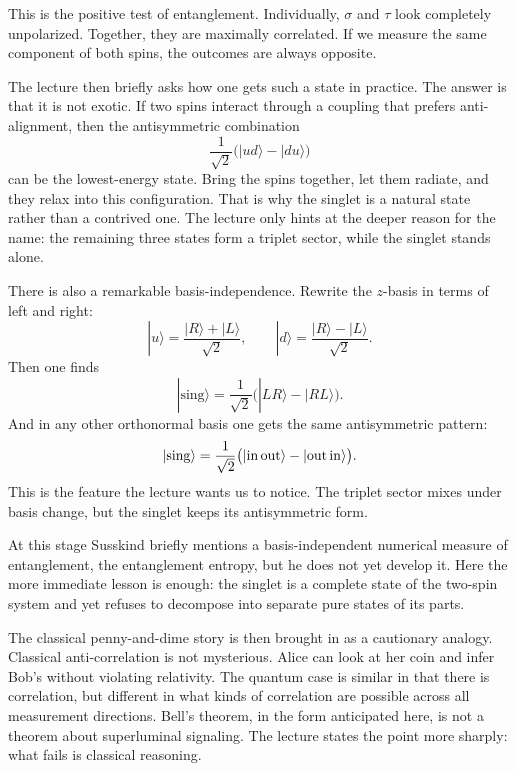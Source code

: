 This is the positive test of entanglement. Individually, \(\sigma\) and \(\tau\) look completely unpolarized. Together, they are maximally correlated. If we measure the same component of both spins, the outcomes are always opposite.

The lecture then briefly asks how one gets such a state in practice. The answer is that it is not exotic. If two spins interact through a coupling that prefers anti-alignment, then the antisymmetric combination
\[
\frac{1}{\sqrt2}\bigl(|ud\rangle-|du\rangle\bigr)
\]
can be the lowest-energy state. Bring the spins together, let them radiate, and they relax into this configuration. That is why the singlet is a natural state rather than a contrived one. The lecture only hints at the deeper reason for the name: the remaining three states form a triplet sector, while the singlet stands alone.

There is also a remarkable basis-independence. Rewrite the \(z\)-basis in terms of left and right:
\begin{equation}
|u\rangle=\frac{|R\rangle+|L\rangle}{\sqrt2},
\qquad
|d\rangle=\frac{|R\rangle-|L\rangle}{\sqrt2}.
\end{equation}
Then one finds
\begin{equation}
|\mathrm{sing}\rangle
=
\frac{1}{\sqrt2}\bigl(|LR\rangle-|RL\rangle\bigr).
\end{equation}
And in any other orthonormal basis one gets the same antisymmetric pattern:
\begin{equation}
|\mathrm{sing}\rangle
=
\frac{1}{\sqrt2}\bigl(|{\rm in}\,{\rm out}\rangle-|{\rm out}\,{\rm in}\rangle\bigr).
\end{equation}
This is the feature the lecture wants us to notice. The triplet sector mixes under basis change, but the singlet keeps its antisymmetric form.

At this stage Susskind briefly mentions a basis-independent numerical measure of entanglement, the entanglement entropy, but he does not yet develop it. Here the more immediate lesson is enough: the singlet is a complete state of the two-spin system and yet refuses to decompose into separate pure states of its parts.

The classical penny-and-dime story is then brought in as a cautionary analogy. Classical anti-correlation is not mysterious. Alice can look at her coin and infer Bob's without violating relativity. The quantum case is similar in that there is correlation, but different in what kinds of correlation are possible across all measurement directions. Bell's theorem, in the form anticipated here, is not a theorem about superluminal signaling. The lecture states the point more sharply: what fails is classical reasoning.

